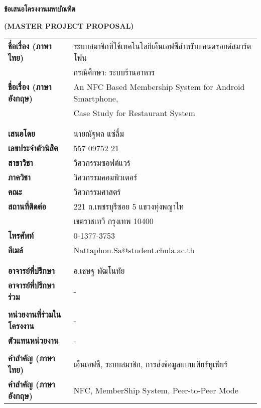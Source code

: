 \documentclass[a4paper]{article}
\begin{document}

\begin{center}
{\huge \bf ข้อเสนอโครงงานมหาบัณฑิต} 
\end{center}

\begin{center}
{\huge \bf (MASTER PROJECT PROPOSAL)} 
\end{center}

\vspace{1cm}
\Large{\noindent\hspace{0.2cm}\setlength{\tabcolsep}{15pt}
\begin{tabular}{l l}    
	\bf ชื่อเรื่อง (ภาษาไทย) 		& ระบบสมาชิกที่ใช้เทคโนโลยีเอ็นเอฟซีสำหรับแอนดรอยด์สมาร์ตโฟน  \\
								& กรณีศึกษา: ระบบร้านอาหาร \\
	\bf ชื่อเรื่อง (ภาษาอังกฤษ)	& An NFC Based Membership System for Android Smartphone,  \\
								& Case Study for Restaurant System \\ 
								& \\
								& \\
	\bf เสนอโดย					& นายณัฐพล แซ่ลิ้ม \\
	\bf เลขประจำตัวนิสิต			& 557 09752 21 \\
	\bf สาขาวิชา					& วิศวกรรมซอฟต์แวร์ \\
	\bf ภาควิชา					& วิศวกรรมคอมพิวเตอร์ \\
	\bf คณะ						& วิศวกรรมศาสตร์ \\
	\bf สถานที่ติดต่อ				& 221 ถ.เพชรบุรีซอย 5 แขวงทุ่งพญาไท \\
								& เขตราชเทวี กรุงเทพ 10400 \\
	\bf โทรศัพท์					& 0-1377-3753 \\
	\bf อีเมล์					&  Nattaphon.Sa@student.chula.ac.th \\
								& \\
								& \\
	\bf อาจารย์ที่ปรึกษา			& อ.เชษฐ พัฒโนทัย \\
	\bf อาจารย์ที่ปรึกษาร่วม		& - \\
								& \\
	\bf หน่วยงานที่ร่วมในโครงงาน	& - \\
	\bf ตัวแทนหน่วยงาน			& - \\
								& \\
	\bf คำสำคัญ (ภาษาไทย)		& เอ็นเอฟซี, ระบบสมาชิก, การส่งข้อมูลแบบเพียร์ทูเพียร์ \\
	\bf คำสำคัญ (ภาษาอังกฤษ)		& NFC, MemberShip System, Peer-to-Peer Mode \\
\end{tabular}
}
\end{document}
